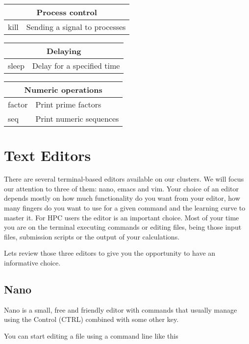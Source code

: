 \begin{tabularx}{0.75\textwidth}{|l|X|}
\hline
\multicolumn{2}{|c|}{Process control}\\ \hline
kill  &               Sending a signal to processes\\
\hline
\end{tabularx}

\begin{tabularx}{0.75\textwidth}{|l|X|}
\hline
\multicolumn{2}{|c|}{Delaying}\\ \hline
sleep  &              Delay for a specified time\\
\hline
\end{tabularx}

\begin{tabularx}{0.75\textwidth}{|l|X|}
\hline
\multicolumn{2}{|c|}{Numeric operations}\\ \hline
factor  &             Print prime factors\\
seq  &                Print numeric sequences\\
\hline
\end{tabularx} 


\section{Text Editors}

There are several terminal-based editors available on our clusters. We will focus our attention to three of them: nano, emacs and vim. 
Your choice of an editor depends mostly on how much functionality do you want from your editor, how many fingers do you want to use for a given command and the learning curve to master it.
For HPC users the editor is an important choice. Most of your time you are on the terminal executing commands or editing files, being those input files, submission scripts or the output of your calculations.


Lets review those three editors to give you the opportunity to have an informative choice.

\subsection{Nano}

Nano is a small, free and friendly editor with commands that usually manage using the Control (CTRL) combined with some other key.

You can start editing a file using a command line like this

